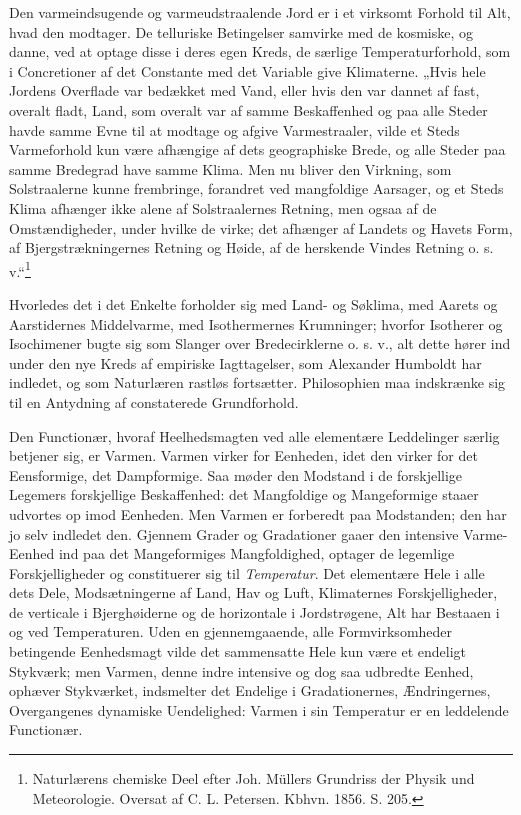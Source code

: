 \documentclass[12pt,a4paper]{book}
\begin{document}
Den varmeindsugende og varmeudstraalende Jord er i et virksomt Forhold til
Alt, hvad den modtager. De telluriske Betingelser samvirke med de
kosmiske, og danne, ved at optage disse i deres egen Kreds, de særlige
Temperaturforhold, som i Concretioner af det Constante med det Variable
give Klimaterne. „Hvis hele Jordens Overflade var bedækket med Vand, eller
hvis den var dannet af fast, overalt fladt, Land, som overalt var af samme
Beskaffenhed og paa alle Steder havde samme Evne til at modtage og afgive
Varmestraaler, vilde et Steds Varmeforhold kun være afhængige af dets
geographiske Brede, og alle Steder paa samme
Bredegrad have samme Klima. Men nu bliver den Virkning, som
Solstraalerne kunne frembringe, forandret ved mangfoldige Aarsager, og et
Steds Klima afhænger ikke alene af Solstraalernes Retning, men ogsaa af de
Omstændigheder, under hvilke de virke; det afhænger af Landets og Havets
Form, af Bjergstrækningernes Retning og Høide, af de herskende Vindes
Retning o. s. v.“\footnote{Naturlærens chemiske Deel efter Joh. Müllers
Grundriss der Physik und Meteorologie. Oversat af C. L. Petersen. Kbhvn.
1856. S. 205.}

Hvorledes det i det Enkelte forholder sig med Land- og Søklima, med
Aarets og Aarstidernes Middelvarme, med Isothermernes Krumninger; hvorfor
Isotherer og Isochimener bugte sig som Slanger over Bredecirklerne o. s. v.,
alt dette hører ind under den nye Kreds af empiriske Iagttagelser, som
Alexander Humboldt har indledet, og som Naturlæren rastløs fortsætter.
Philosophien maa indskrænke sig til en Antydning af constaterede
Grundforhold.

Den Functionær, hvoraf Heelhedsmagten ved alle elementære Leddelinger
særlig betjener sig, er Varmen. Varmen virker for Eenheden, idet den
virker for det Eensformige, det Dampformige. Saa møder den Modstand i de
forskjellige Legemers forskjellige Beskaffenhed: det Mangfoldige og
Mangeformige staaer udvortes op imod Eenheden. Men Varmen er forberedt
paa Modstanden; den har jo selv indledet den. Gjennem Grader og
Gradationer gaaer den intensive Varme-Eenhed ind paa det Mangeformiges
Mangfoldighed, optager de legemlige Forskjelligheder og constituerer sig
til \emph{Temperatur}. Det elementære Hele i alle dets Dele,
Modsætningerne af Land, Hav og Luft, Klimaternes Forskjelligheder, de
verticale i Bjerghøiderne og de horizontale i Jordstrøgene, Alt har
Bestaaen i og ved Temperaturen. Uden en gjennemgaaende, alle
Formvirksomheder betingende
Eenhedsmagt vilde det sammensatte Hele kun være et endeligt Stykværk; men
Varmen, denne indre intensive og dog saa udbredte Eenhed, ophæver
Stykværket, indsmelter det Endelige i Gradationernes, Ændringernes,
Overgangenes dynamiske Uendelighed: Varmen i sin Temperatur er en
leddelende Functionær.
\end{document}
